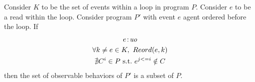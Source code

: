 
\begin{corollary}
    \label{LoopInvCodeMotRead2}
    Consider $K$ to be the set of events within a loop in program $P$. Consider $e$ to be a read within the loop. Consider program $P'$ with event $e$ agent ordered before the loop. If
    \begin{gather}
        e\!:\!\textit{uo} \label{licmr2:eq1}\\
        \forall k \neq e \in K, \ Reord(e, k) \label{licmr2:eq2}\\ 
        \nexists C^i \in P \ \text{s.t.} \ e^{j<=i} \notin C  \label{licmr2:eq3}                    
    \end{gather}
    then the set of observable behaviors of $P'$ is a subset of $P$.
\end{corollary}

